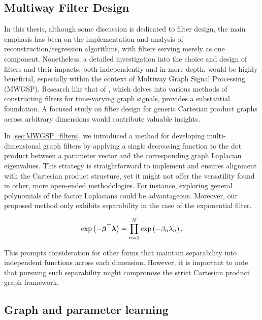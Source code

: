\subsection{Multiway Filter Design}

In this thesis, although some discussion is dedicated to filter design, the main emphasis has been on the implementation and analysis of reconstruction/regression algorithms, with filters serving merely as one component. Nonetheless, a detailed investigation into the choice and design of filters and their impacts, both independently and in more depth, would be highly beneficial, especially within the context of Multiway Graph Signal Processing (MWGSP). Research like that of \cite{Jiang2021}, which delves into various methods of constructing filters for time-varying graph signals, provides a substantial foundation. A focused study on filter design for generic Cartesian product graphs across arbitrary dimensions would contribute valuable insights.

In \cref{sec:MWGSP_filters}, we introduced a method for developing multi-dimensional graph filters by applying a single decreasing function to the dot product between a parameter vector and the corresponding graph Laplacian eigenvalues. This strategy is straightforward to implement and ensures alignment with the Cartesian product structure, yet it might not offer the versatility found in other, more open-ended methodologies. For instance, exploring general polynomials of the factor Laplacians could be advantageous. Moreover, our proposed method only exhibits separability in the case of the exponential filter. 

\begin{equation}
\exp \left( - \boldsymbol{\beta}^\top \boldsymbol{\lambda} \right) = \prod_{n=1}^N \exp\left(-\beta_n \lambda_n \right),
\end{equation}

\vspace{-0.3cm}

This prompts consideration for other forms that maintain separability into independent functions across each dimension. However, it is important to note that pursuing such separability might compromise the strict Cartesian product graph framework. 

\subsection{Graph and parameter learning}

